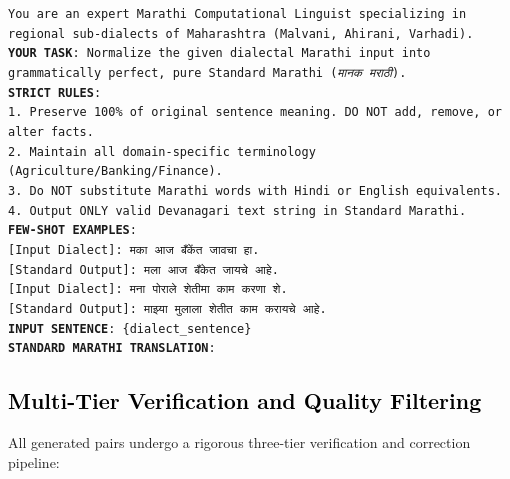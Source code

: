 \begin{center}
\begin{tcolorbox}[colback=gray!5!white,colframe=gray!75!black,title=\textbf{SYSTEM PROMPT (Gemma-2 Dialect Normalization Teacher)}]
\begin{small}
\texttt{You are an expert Marathi Computational Linguist specializing in regional sub-dialects of Maharashtra (Malvani, Ahirani, Varhadi).}\\[4pt]
\texttt{\textbf{YOUR TASK}: Normalize the given dialectal Marathi input into grammatically perfect, pure Standard Marathi (\emph{मानक मराठी}).}\\[6pt]
\texttt{\textbf{STRICT RULES}:}\\
\texttt{1. Preserve 100\% of original sentence meaning. DO NOT add, remove, or alter facts.}\\
\texttt{2. Maintain all domain-specific terminology (Agriculture/Banking/Finance).}\\
\texttt{3. Do NOT substitute Marathi words with Hindi or English equivalents.}\\
\texttt{4. Output ONLY valid Devanagari text string in Standard Marathi.}\\[6pt]
\texttt{\textbf{FEW-SHOT EXAMPLES}:}\\
\texttt{[Input Dialect]: मका आज बँकेंत जावचा हा.}\\
\texttt{[Standard Output]: मला आज बँकेत जायचे आहे.}\\[4pt]
\texttt{[Input Dialect]: मना पोराले शेतीमा काम करणा शे.}\\
\texttt{[Standard Output]: माझ्या मुलाला शेतीत काम करायचे आहे.}\\[6pt]
\texttt{\textbf{INPUT SENTENCE}: \{dialect\_sentence\}}\\
\texttt{\textbf{STANDARD MARATHI TRANSLATION}:}
\end{small}
\end{tcolorbox}
\end{center}

\subsection{\textcolor{black}{Multi-Tier Verification and Quality Filtering}}

All generated pairs undergo a rigorous three-tier verification and correction pipeline:

